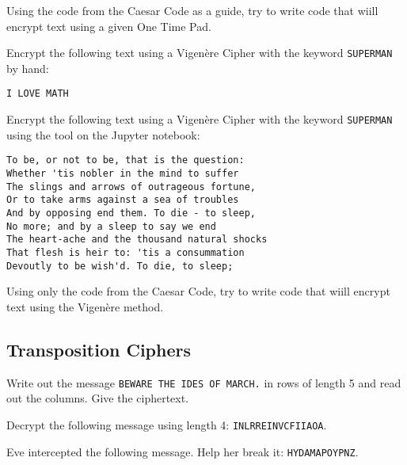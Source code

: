 \documentclass[11pt,a4paper]{report}
\begin{document}
\begin{ex}
Using the code from the Caesar Code as a guide, try to write code that wiill encrypt text using a given  One Time Pad.
\end{ex}






\begin{ex}
Encrypt the following text using a Vigenère Cipher with the keyword \verb|SUPERMAN| by hand:
\begin{verbatim}
I LOVE MATH
\end{verbatim}

\end{ex}


\begin{ex}
Encrypt the following text using a Vigenère Cipher with the keyword \verb|SUPERMAN| using the tool on the Jupyter notebook:
\begin{verbatim}
To be, or not to be, that is the question:
Whether 'tis nobler in the mind to suffer
The slings and arrows of outrageous fortune,
Or to take arms against a sea of troubles
And by opposing end them. To die - to sleep,
No more; and by a sleep to say we end
The heart-ache and the thousand natural shocks
That flesh is heir to: 'tis a consummation
Devoutly to be wish'd. To die, to sleep;
\end{verbatim}
\end{ex}


\begin{ex}
Using only the code from the Caesar Code, try to write code that wiill encrypt text using the Vigenère method.
\end{ex}


\subsection{Transposition Ciphers}


\begin{ex}
Write out the message
\verb|BEWARE THE IDES OF MARCH.|
in rows of length 5 and read out the columns. Give the ciphertext.
\end{ex}

\begin{ex}
Decrypt the following message using length 4: \verb|INLRREINVCFIIAOA|.
\end{ex}

\begin{ex}
Eve intercepted the following message. Help her break it: \verb|HYDAMAPOYPNZ|.
\end{ex}
\end{document}
